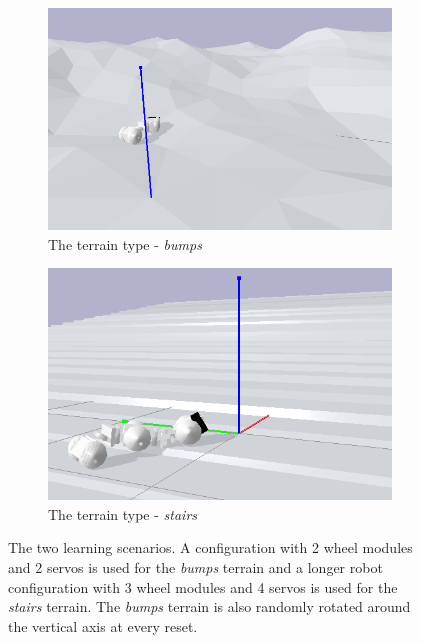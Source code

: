 \documentclass{article}
\begin{document}
\begin{figure}[ht]
\begin{subfigure}{.5\textwidth}
  \centering
  \includegraphics[width=.95\linewidth]{fig/bumps.png}  
  \caption{The terrain type - \textit{bumps}}
  \label{fig:sub-first}
\end{subfigure}
\begin{subfigure}{.5\textwidth}
  \centering
  \includegraphics[width=.95\linewidth]{fig/stairs.png}  
  \caption{The terrain type - \textit{stairs}}
  \label{fig:sub-second}
\end{subfigure}
  \caption{The two learning scenarios. 
  A configuration with 2 wheel modules and 2 servos is used for the \textit{bumps} terrain and a longer robot configuration with 3 wheel modules and 4 servos is used for the \textit{stairs} terrain.
  The \textit{bumps} terrain is also randomly rotated around the vertical axis at every reset. }
\label{fig:terrains}
\end{figure}
\end{document}
